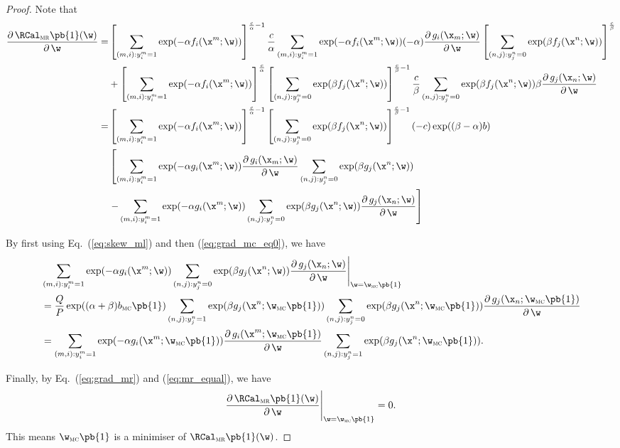 \begin{proof}
Note that
\begin{equation}
\label{eq:grad_mr}
\begin{aligned}
\frac{\partial \, \RCal_\textsc{mr}\pb{1}(\w)} {\partial \, \w}
=& \left[ \sum_{(m,i): y_i^m = 1} \exp(-\alpha f_i(\x^m; \w)) \right]^{\frac{c}{\alpha} - 1} \frac{c}{\alpha} 
   \sum_{(m,i): y_i^m = 1} \exp(-\alpha f_i(\x^m; \w)) (-\alpha) \frac{\partial \, g_i(\x_m; \w)}{\partial \, \w}
   \left[ \sum_{(n,j): y_j^n = 0} \exp( \beta  f_j(\x^n; \w)) \right]^\frac{c}{\beta} \\
 & + \left[ \sum_{(m,i): y_i^m = 1} \exp(-\alpha f_i(\x^m; \w)) \right]^\frac{c}{\alpha}
     \left[ \sum_{(n,j): y_j^n = 0} \exp( \beta  f_j(\x^n; \w)) \right]^{\frac{c}{\beta} - 1} \frac{c}{\beta}
     \sum_{(n,j): y_j^n = 0} \exp( \beta  f_j(\x^n; \w)) \beta \frac{\partial \, g_j(\x_n; \w)}{\partial \, \w} \\
=& \left[ \sum_{(m,i): y_i^m = 1} \exp(-\alpha f_i(\x^m; \w)) \right]^{\frac{c}{\alpha} - 1}
   \left[ \sum_{(n,j): y_j^n = 0} \exp( \beta  f_j(\x^n; \w)) \right]^{\frac{c}{\beta} - 1} (-c) 
   \exp((\beta - \alpha) b) \\
 & \left[ 
   \sum_{(m,i): y_i^m = 1} \exp(-\alpha g_i(\x^m; \w)) \frac{\partial \, g_i(\x_m; \w)}{\partial \, \w}
   \sum_{(n,j): y_j^n = 0} \exp( \beta  g_j(\x^n; \w)) \right. \\
 & \left. - 
   \sum_{(m,i): y_i^m = 1} \exp(-\alpha g_i(\x^m; \w)) 
   \sum_{(n,j): y_j^n = 0} \exp( \beta  g_j(\x^n; \w)) \frac{\partial \, g_j(\x_n; \w)}{\partial \, \w} \right]
\end{aligned}
\end{equation}

By first using Eq.~(\ref{eq:skew_ml}) and then (\ref{eq:grad_mc_eq0}), we have
\begin{equation}
\label{eq:mr_equal}
\begin{aligned}
&  \sum_{(m,i): y_i^m = 1} \exp(-\alpha g_i(\x^m; \w)) 
   \sum_{(n,j): y_j^n = 0} \exp( \beta  g_j(\x^n; \w)) \frac{\partial \, g_j(\x_n; \w)}{\partial \, \w}
   \Bigg|_{\w = \w_\textsc{mc}\pb{1}} \\ 
&= \frac{Q}{P} \exp((\alpha + \beta) b_\textsc{mc}\pb{1}) 
   \sum_{(n,j): y_j^n = 1} \exp( \beta  g_j(\x^n; \w_\textsc{mc}\pb{1}))
   \sum_{(n,j): y_j^n = 0} \exp(\beta g_j(\x^n; \w_\textsc{mc}\pb{1})) \frac{\partial \, g_j(\x_n; \w_\textsc{mc}\pb{1})}{\partial \, \w} \\
&= \sum_{(m,i): y_i^m = 1} \exp(-\alpha g_i(\x^m; \w_\textsc{mc}\pb{1})) \frac{\partial \, g_i(\x^m; \w_\textsc{mc}\pb{1})}{\partial \, \w}
   \sum_{(n,j): y_j^n = 1} \exp( \beta  g_j(\x^n; \w_\textsc{mc}\pb{1})).
\end{aligned}
\end{equation}

Finally, by Eq.~(\ref{eq:grad_mr}) and (\ref{eq:mr_equal}), we have
$$
\frac{\partial \, \RCal_\textsc{mr}\pb{1}(\w)} {\partial \, \w} \Bigg|_{\w = \w_\textsc{mc}\pb{1}} = 0.
$$
This means $\w_\textsc{mc}\pb{1}$ is a minimiser of $\RCal_\textsc{mr}\pb{1}(\w)$.
\end{proof}


